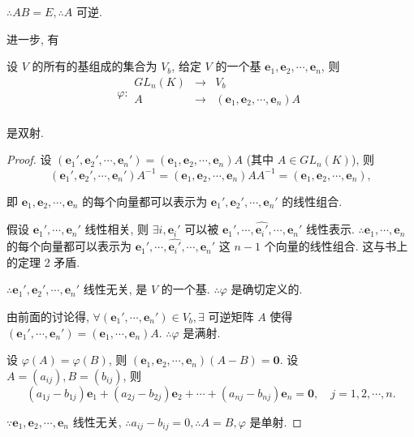 \documentclass[color=black,device=normal,lang=cn,mode=geye]{elegantnote}
\begin{document}
$\therefore AB=E,\therefore A$ 可逆.

进一步, 有
\begin{theorem}\label{t1.1}
    设 $V$ 的所有的基组成的集合为 $V_b$, 给定 $V$ 的一个基 $\boldsymbol{e}_1,\boldsymbol{e}_2,\cdots,\boldsymbol{e}_n$, 则
    \[\varphi:\begin{array}{rcl}
        GL_n(K) & \to & V_b \\
        A & \to & (\boldsymbol{e}_1,\boldsymbol{e}_2,\cdots,\boldsymbol{e}_n)A \\
    \end{array}\]

    是双射.
\end{theorem}
\begin{proof}
    设 $(\boldsymbol{e}_1',\boldsymbol{e}_2',\cdots,\boldsymbol{e}_n')=(\boldsymbol{e}_1,\boldsymbol{e}_2,\cdots,\boldsymbol{e}_n)A$ (其中 $A\in GL_n(K)$), 则
    \[(\boldsymbol{e}_1',\boldsymbol{e}_2',\cdots,\boldsymbol{e}_n')A^{-1}=(\boldsymbol{e}_1,\boldsymbol{e}_2,\cdots,\boldsymbol{e}_n)AA^{-1}=(\boldsymbol{e}_1,\boldsymbol{e}_2,\cdots,\boldsymbol{e}_n),\]

    即 $\boldsymbol{e}_1,\boldsymbol{e}_2,\cdots,\boldsymbol{e}_n$ 的每个向量都可以表示为 $\boldsymbol{e}_1',\boldsymbol{e}_2',\cdots,\boldsymbol{e}_n'$ 的线性组合.

    假设 $\boldsymbol{e}_1',\cdots,\boldsymbol{e}_n'$ 线性相关, 则 $\exists i,\boldsymbol{e}_i'$ 可以被 $\boldsymbol{e}_1',\cdots,\widehat{\boldsymbol{e}_i'},\cdots,\boldsymbol{e}_n'$ 线性表示. $\therefore\boldsymbol{e}_1,\cdots,\boldsymbol{e}_n$ 的每个向量都可以表示为 $\boldsymbol{e}_1',\cdots,\widehat{\boldsymbol{e}_i'},\cdots,\boldsymbol{e}_n'$ 这 $n-1$ 个向量的线性组合. 这与书上的定理 2 矛盾.

    $\therefore\boldsymbol{e}_1',\boldsymbol{e}_2',\cdots,\boldsymbol{e}_n'$ 线性无关, 是 $V$ 的一个基. $\therefore\varphi$ 是确切定义的.

    由前面的讨论得, $\forall(\boldsymbol{e}_1',\cdots,\boldsymbol{e}_n')\in V_b,\exists$ 可逆矩阵 $A$ 使得 $(\boldsymbol{e}_1',\cdots,\boldsymbol{e}_n')=(\boldsymbol{e}_1,\cdots,\boldsymbol{e}_n)A$. $\therefore\varphi$ 是满射.

    设 $\varphi(A)=\varphi(B)$, 则 $(\boldsymbol{e}_1,\boldsymbol{e}_2,\cdots,\boldsymbol{e}_n)(A-B)=\boldsymbol{0}$. 设 $A=(a_{ij}),B=(b_{ij})$, 则
    \[(a_{1j}-b_{1j})\boldsymbol{e}_1+(a_{2j}-b_{2j})\boldsymbol{e}_2+\cdots+(a_{nj}-b_{nj})\boldsymbol{e}_n=\boldsymbol{0},\quad j=1,2,\cdots,n.\]

    $\because\boldsymbol{e}_1,\boldsymbol{e}_2,\cdots,\boldsymbol{e}_n$ 线性无关, $\therefore a_{ij}-b_{ij}=0,\therefore A=B,\varphi$ 是单射.
\end{proof}
\end{document}
